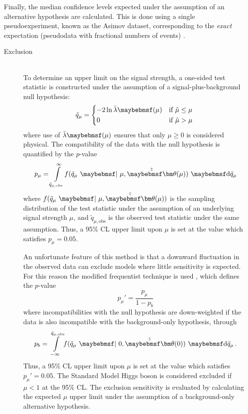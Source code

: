 Finally, the median confidence levels expected under the assumption of an alternative 
hypothesis are calculated. This is done using a single pseudoexperiment, known as the Asimov 
dataset, corresponding to the \textit{exact} expectation (\ie pseudodata with fractional 
numbers of events) \cite{Cowan:2010}.

\begin{description}
\item[Exclusion] \hfill \\
	To determine an upper limit on the signal strength, a one-sided test statistic is 
	constructed under the assumption of a signal-plus-background null hypothesis:
	\begin{equation}
		\tilde{q}_{\mu} = 
		\begin{dcases*}
			-2 \ln \tilde{\lambda}\parenths{\mu} & if $\hat{\mu} \leq \mu$ \\
			0 & if $\hat{\mu} > \mu$
		\end{dcases*}
	\end{equation}
	where use of $\tilde{\lambda}\parenths{\mu}$ ensures that only $\mu \geq 0$ is 
	considered physical. The compatibility of the data with the null hypothesis is 
	quantified by the $p$-value
	\begin{equation}
		p_{\mu} = \int\limits_{\tilde{q}_{\mu,\text{obs}}}^{\infty} \! f(\tilde{q}_{\mu}~\given~\mu, \hat{\hat{\bvec{\theta}}}(\mu)) \,\, \d{\tilde{q}_{\mu}}
	\end{equation}
	where $f(\tilde{q}_{\mu}~\given~\mu, \hat{\hat{\bvec{\theta}}}(\mu))$ is the sampling 
	distribution of the test statistic under the assumption of an underlying signal strength 
	$\mu$, and $\tilde{q}_{\mu,\text{obs}}$ is the observed test statistic under the same 
	assumption. Thus, a 95\% CL upper limit upon $\mu$ is set at the value which satisfies 
	$p_{\mu} = 0.05$.

	An unfortunate feature of this method is that a downward fluctuation in the observed 
	data can exclude models where little sensitivity is expected. For this reason the 
	modified frequentist \CLs technique is used \cite{Junk:CLs,Read:CLs}, which defines the 
	$p$-value
	\begin{equation}
		p_{\mu}' = \frac{p_{\mu}}{1 - p_{b}}
	\end{equation}
	where incompatibilities with the null hypothesis are down-weighted if the data is also 
	incompatible with the background-only hypothesis, through
	\begin{equation}
		p_{b} = \int\limits_{-\infty}^{\tilde{q}_{\mu,\text{obs}}} \! f(\tilde{q}_{\mu}~\given~0, \hat{\hat{\bvec{\theta}}}(0)) \,\, \d{\tilde{q}_{\mu}} \,.
	\end{equation}
	Thus, a 95\% CL upper limit upon $\mu$ is set at the value which satisfies 
	$p_{\mu}' = 0.05$. The Standard Model Higgs boson is considered excluded if $\mu < 1$ at 
	the 95\% CL. The exclusion sensitivity is evaluated by calculating the expected $\mu$ 
	upper limit under the assumption of a background-only alternative hypothesis.


\end{description}
